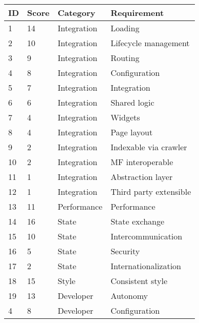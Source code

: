 \begin{table}[]
    \begin{tabular}{|l|l|l|l|}
        \hline
        \textbf{\ac{ID}}  &
        \textbf{Score}    &
        \textbf{Category} &
        \textbf{Requirement}
        \\ \hline
        1                 & 14 & Integration & Loading                \\ \hline
        2                 & 10 & Integration & Lifecycle management   \\ \hline
        3                 & 9  & Integration & Routing                \\ \hline
        4                 & 8  & Integration & Configuration          \\ \hline
        5                 & 7  & Integration & Integration            \\ \hline
        6                 & 6  & Integration & Shared logic           \\ \hline
        7                 & 4  & Integration & Widgets                \\ \hline
        8                 & 4  & Integration & Page layout            \\ \hline
        9                 & 2  & Integration & Indexable via crawler  \\ \hline
        10                & 2  & Integration & \ac{MF} interoperable  \\ \hline
        11                & 1  & Integration & Abstraction layer      \\ \hline
        12                & 1  & Integration & Third party extensible \\ \hline
        13                & 11 & Performance & Performance            \\ \hline
        14                & 16 & State       & State exchange         \\ \hline
        15                & 10 & State       & Intercommunication     \\ \hline
        16                & 5  & State       & Security               \\ \hline
        17                & 2  & State       & Internationalization   \\ \hline
        18                & 15 & Style       & Consistent style       \\ \hline
        19                & 13 & Developer   & Autonomy               \\ \hline
        4                 & 8  & Developer   & Configuration          \\ \hline

\end{tabular}
\end{table}
